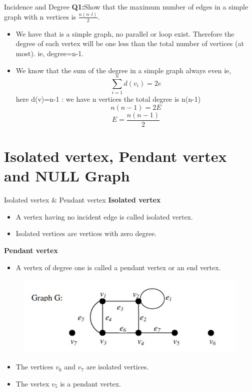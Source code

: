 \documentclass{beamer}
\begin{document}
\begin{frame}{Incidence and Degree}
\textbf{Q1:}Show that the maximum number of edges in a simple graph with n
vertices is $\frac{n(n – l)}{2}$.
\begin{itemize}
	\item We have that is a simple graph, no parallel or loop exist. Therefore the degree of each vertex will be one less than the total number of vertices (at most). ie, degree=n-1.
	\item We know that the sum of the degree in a simple graph always even ie, $$\sum_{i=1}^{n} d(v_i) = 2e$$
	here d(v)=n-1 : we have n vertices the total degree is n(n-1) $$n(n-1)=2E$$
	$$E=\frac{n(n-1)}{2}$$
\end{itemize}
\end{frame}
\section{Isolated vertex, Pendant vertex and NULL Graph}
\begin{frame}{Isolated vertex \& Pendant vertex}
	\textbf{Isolated vertex}
	\begin{itemize}
		\item A vertex having no incident edge is called isolated vertex.
		\item Isolated 
		vertices are vertices with zero degree.
	\end{itemize}
\textbf{Pendant vertex}
\begin{itemize}
	\item A vertex of degree one is called a pendant vertex or an end 
	vertex.

\end{itemize}
\begin{figure}
	\includegraphics[scale=.4]{img/m18}
\end{figure}
\begin{itemize}
	\item The vertices $v_6$ and $v_7$ are isolated vertices.
	\item The vertex $v_5$ is a pendant vertex.
\end{itemize}
\end{frame}
\end{document}
